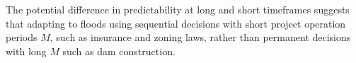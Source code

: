 
The potential difference in predictability at long and short timeframes suggests that adapting to floods using sequential decisions with short project operation periods $M$, such as insurance and zoning laws, rather than permanent decisions with long $M$ such as dam construction.
